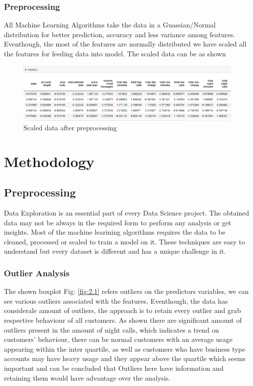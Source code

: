 \documentclass[a4paper,12pt]{report}
\begin{document}
\FloatBarrier
\subsection{Preprocessing}
All Machine Learning Algorithms take the data in a Guassian/Normal distribution for better prediction, accuracy and less variance among features. Eventhough, the most of the features are normally distributed we have scaled all the features for feeding data into model. The scaled data can be as shown 
\begin{figure}[h]
\vspace{-4pt}
\center
\includegraphics[scale = 0.5]{scaled_df.png}
\caption{Scaled data after preprocessing}
\label{fig:1.1}
\end{figure}
\FloatBarrier

\vspace{-05pt}
\chapter{Methodology}

\section{Preprocessing}
Data Exploration is an essential part of every Data Science project. The obtained data may not be always in the required form to perform any analysis or get insights. Most of the machine learining algorithms requires the data to be cleaned, processed or scaled to train a model on it. These techniques are easy to understand but every dataset is different and has a unique challenge in it.
\subsection{Outlier Analysis}

The shown boxplot Fig: \ref{fig:2.1} refers outliers on the predictors variables, we can see various outliers associated with the features. Eventhough, the data has considerale amount of outliers, the approach is to retain every outlier and grab respective behaviour of all customers. As shown there are significant amount of outliers present in the amount of night calls, which indicates a trend on customers' behaviour, there can be normal customers with an average usage appearing within the inter quartile, as well as customers who have business type accounts may have heavy usage and they appear above the quartile which seems important and can be concluded that Outliers here have information and retaining them would have advantage over the analysis.
\end{document}
